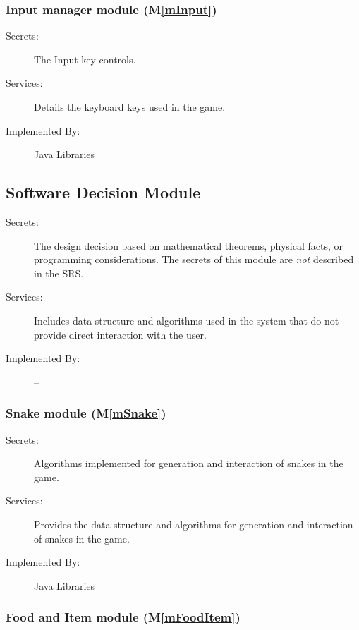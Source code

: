 \documentclass[12pt, titlepage]{article}
\newcommand{\mref}[1]{M\ref{#1}}
\begin{document}
\subsubsection{Input manager module (\mref{mInput})}

\begin{description}
\item[Secrets:]The Input key controls.
\item[Services:]Details the keyboard keys used in the game.
\item[Implemented By:] Java Libraries
\end{description}

\subsection{Software Decision Module}

\begin{description}
\item[Secrets:] The design decision based on mathematical theorems, physical
  facts, or programming considerations. The secrets of this module are
  \emph{not} described in the SRS.
\item[Services:] Includes data structure and algorithms used in the system that
  do not provide direct interaction with the user. 
\item[Implemented By:] --
\end{description}

\subsubsection{Snake module (\mref{mSnake})}

\begin{description}
\item[Secrets:]Algorithms implemented for generation and interaction of snakes in the game.
\item[Services:]Provides the data structure and algorithms for generation and interaction of snakes in the game.
\item[Implemented By:] Java Libraries
\end{description}

\subsubsection{Food and Item module (\mref{mFoodItem})}
\end{document}
